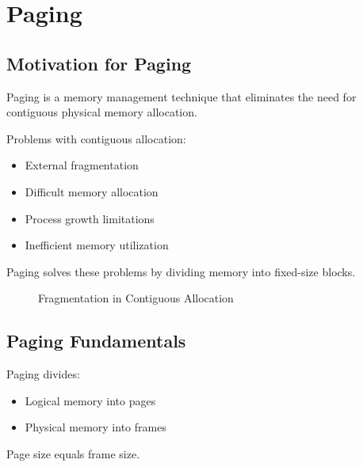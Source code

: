 \chapter{Paging}

\section{Motivation for Paging}

Paging is a memory management technique that eliminates the need for contiguous physical memory allocation.

Problems with contiguous allocation:

\begin{itemize}
\item External fragmentation
\item Difficult memory allocation
\item Process growth limitations
\item Inefficient memory utilization
\end{itemize}

Paging solves these problems by dividing memory into fixed-size blocks.

\begin{figure}[H]
\centering
{}
\caption{Fragmentation in Contiguous Allocation}
\end{figure}

\section{Paging Fundamentals}

Paging divides:

\begin{itemize}
\item Logical memory into pages
\item Physical memory into frames
\end{itemize}

Page size equals frame size.

